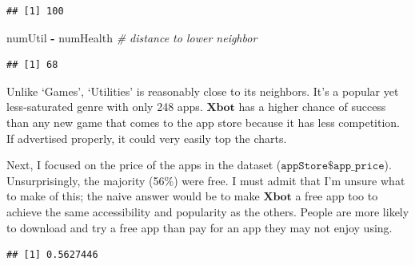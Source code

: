 \documentclass[]{article}
\newenvironment{Shaded}{\begin{snugshade}}{\end{snugshade}}
\newcommand{\CommentTok}[1]{\textcolor[rgb]{0.56,0.35,0.01}{\textit{#1}}}
\newcommand{\DecValTok}[1]{\textcolor[rgb]{0.00,0.00,0.81}{#1}}
\newcommand{\FloatTok}[1]{\textcolor[rgb]{0.00,0.00,0.81}{#1}}
\newcommand{\KeywordTok}[1]{\textcolor[rgb]{0.13,0.29,0.53}{\textbf{#1}}}
\newcommand{\NormalTok}[1]{#1}
\newcommand{\OperatorTok}[1]{\textcolor[rgb]{0.81,0.36,0.00}{\textbf{#1}}}
\newcommand{\StringTok}[1]{\textcolor[rgb]{0.31,0.60,0.02}{#1}}
\begin{document}
\begin{verbatim}
## [1] 100
\end{verbatim}

\begin{Shaded}
\begin{Highlighting}[]
\NormalTok{numUtil }\OperatorTok{-}\StringTok{ }\NormalTok{numHealth              }\CommentTok{# distance to lower neighbor}
\end{Highlighting}
\end{Shaded}

\begin{verbatim}
## [1] 68
\end{verbatim}

Unlike `Games', `Utilities' is reasonably close to its neighbors. It's a
popular yet less-saturated genre with only 248 apps. \(\textbf{Xbot}\)
has a higher chance of success than any new game that comes to the app
store because it has less competition. If advertised properly, it could
very easily top the charts.

Next, I focused on the price of the apps in the dataset
(\(\texttt{appStore\$app\_price}\)). Unsurprisingly, the majority (56\%)
were free. I must admit that I'm unsure what to make of this; the naive
answer would be to make \(\textbf{Xbot}\) a free app too to achieve the
same accessibility and popularity as the others. People are more likely
to download and try a free app than pay for an app they may not enjoy
using.

\begin{Shaded}
\end{Shaded}

\begin{verbatim}
## [1] 0.5627446
\end{verbatim}

\begin{Shaded}
\end{Shaded}
\end{document}
